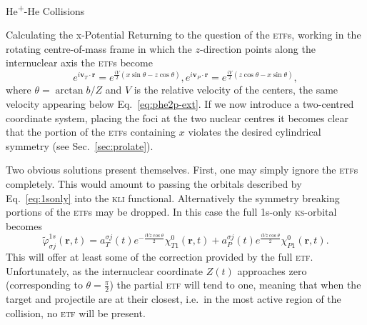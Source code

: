 \documentclass[letterpaper, 11 pt]{report}
\begin{document}
\begin{chapter}{\texorpdfstring{He\textsuperscript{+}}{He+}-He Collisions \label{chap:hephe}}
\begin{section}{Calculating the x-Potential \label{sec:pot}}
      Returning to the question of the \textsc{etf}s, working in the rotating centre-of-mass frame in
      which the $z$-direction points along the internuclear axis the \textsc{etf}s become
      \begin{subequations} \label{eq:etf}
         \begin{equation} \label{eq:etfT}
            e^{i \mathbf{v}_T \cdot \mathbf{r}} =
             e^{\frac{i V}{2} (x \sin \theta - z \cos \theta)},
         \end{equation}
         \begin{equation} \label{eq:etfP}
            e^{i \mathbf{v}_P \cdot \mathbf{r}} =
             e^{\frac{i V}{2} (z \cos \theta - x \sin \theta)},
         \end{equation}
      \end{subequations}
      where $\theta = \arctan b/Z$ and $V$ is the relative velocity of the centers, the same velocity
      appearing below Eq.~\eqref{eq:phe2p-ext}. If we now introduce a two-centred coordinate system,
      placing the foci at the two nuclear centres it becomes clear that the portion of the \textsc{etf}s
      containing $x$ violates the desired cylindrical symmetry (see Sec.~\ref{sec:prolate}).

      Two obvious solutions present themselves. First, one may simply ignore the \textsc{etf}s
      completely. This would amount to passing the orbitals described by Eq.~\eqref{eq:1sonly} into
      the \textsc{kli} functional. Alternatively the symmetry breaking portions of the \textsc{etf}s
      may be dropped. In this case the full 1s-only \textsc{ks}-orbital becomes
      \begin{equation} \label{eq:1sonlyetf}
         \tilde{\varphi}_{\sigma j}^{1s} (\mathbf{r},t) =
                      a^{\sigma j}_T (t)  e^{-\frac{i V z \cos \theta}{2}} \chi^{0}_{T1} (\mathbf{r},t)
                    + a^{\sigma j}_P (t)  e^{ \frac{i V z \cos \theta}{2}} \chi^{0}_{P1} (\mathbf{r},t).
      \end{equation}
      This will offer at least some of the correction provided by the full \textsc{etf}. Unfortunately,
      as the internuclear coordinate $Z(t)$ approaches zero (corresponding to $\theta = \frac{\pi}{2}$)
      the partial \textsc{etf} will tend to one, meaning that when the target and projectile are at
      their closest, i.e.\ in the most active region of the collision, no \textsc{etf} will be present.


\end{section}
\end{chapter}
\end{document}
